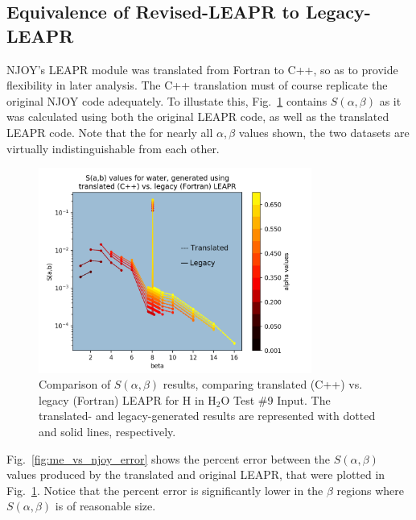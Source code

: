 \documentclass[Master.tex]{subfiles}
\begin{document}
		\subsection{Equivalence of Revised-LEAPR to Legacy-LEAPR}
                   NJOY's LEAPR module was translated from Fortran to C++, so as to provide flexibility in later analysis. The C++ translation must of course replicate the original NJOY code adequately. To illustate this, Fig.~\ref{fig:me_vs_njoy_sab} contains $S(\alpha,\beta)$ as it was calculated using both the original LEAPR code, as well as the translated LEAPR code. Note that the for nearly all $\alpha,\beta$ values shown, the two datasets are virtually indistinguishable from each other.
                       \begin{figure}[H]
                           \begin{center}
                              \includegraphics[width=0.8\textwidth]{images/me-vs-njoy-1-orig}
                             \caption[Comparison of Translated vs. Legacy LEAPR, for Test \#9 ($S(\alpha,\beta)$)]{Comparison of $S(\alpha,\beta)$ results, comparing translated (C++) vs. legacy (Fortran) LEAPR for H in H$_2$O Test \#9 Input. The translated- and legacy-generated results are represented with dotted and solid lines, respectively.}
                              \label{fig:me_vs_njoy_sab}
                           \end{center}
                      \end{figure}
                      Fig.~\ref{fig:me_vs_njoy_error} shows the percent error between the $S(\alpha,\beta)$ values produced by the translated and original LEAPR, that were plotted in Fig.~\ref{fig:me_vs_njoy_sab}.  Notice that the percent error is significantly lower in the $\beta$ regions where $S(\alpha,\beta)$ is of reasonable size. 
\end{document}
